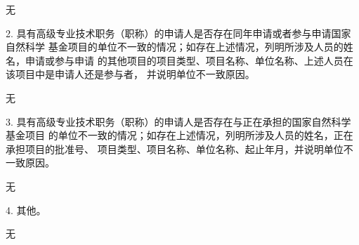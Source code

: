\documentclass[12pt,UTF8,AutoFakeBold=3,a4paper]{article}
\newcommand{\sihao}{\fontsize{14pt}{\baselineskip}\selectfont}
\begin{document}

无

{\kaishu{}\sihao{} \color{NsfcBlue}
2. 具有高级专业技术职务（职称）的申请人是否存在同年申请或者参与申请国家自然科学
基金项目的单位不一致的情况；如存在上述情况，列明所涉及人员的姓名，申请或参与申请
的其他项目的项目类型、项目名称、单位名称、上述人员在该项目中是申请人还是参与者，
并说明单位不一致原因。
}


无

{\kaishu{}\sihao{} \color{NsfcBlue}
3. 具有高级专业技术职务（职称）的申请人是否存在与正在承担的国家自然科学基金项目
的单位不一致的情况；如存在上述情况，列明所涉及人员的姓名，正在承担项目的批准号、
项目类型、项目名称、单位名称、起止年月，并说明单位不一致原因。
}


无

{\kaishu{}\sihao{} \color{NsfcBlue}
4. 其他。
}


无


\end{document}
